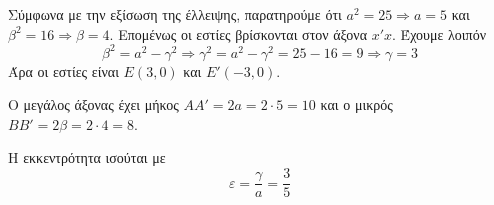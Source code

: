 \begin{alist}
\item Σύμφωνα με την εξίσωση της έλλειψης, παρατηρούμε ότι $ a^2=25\Rightarrow a=5 $ και $\beta^2=16\Rightarrow \beta=4$. Επομένως οι εστίες βρίσκονται στον άξονα $ x'x $. Έχουμε λοιπόν
\[ \beta^2=a^2-\gamma^2\Rightarrow \gamma^2=a^2-\gamma^2=25-16=9\Rightarrow \gamma=3 \]
Άρα οι εστίες είναι $ E(3,0) $ και $ E'(-3,0) $.
\item Ο μεγάλος άξονας έχει μήκος $ AA'=2a=2\cdot 5=10 $ και ο μικρός $ BB'=2\beta=2\cdot 4=8 $. 
\item Η εκκεντρότητα ισούται με 
\[ \varepsilon=\frac{\gamma}{a}=\frac{3}{5} \]
\end{alist}
